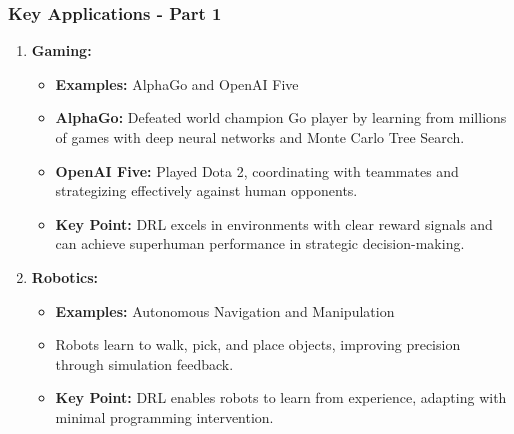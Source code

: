 \documentclass[aspectratio=169]{beamer}
\begin{document}
\begin{frame}[fragile]
    \frametitle{Key Applications - Part 1}
    \begin{enumerate}
        \item \textbf{Gaming:}
            \begin{itemize}
                \item \textbf{Examples:} AlphaGo and OpenAI Five
                \item \textbf{AlphaGo:} Defeated world champion Go player by learning from millions of games with deep neural networks and Monte Carlo Tree Search.
                \item \textbf{OpenAI Five:} Played Dota 2, coordinating with teammates and strategizing effectively against human opponents.
                \item \textbf{Key Point:} DRL excels in environments with clear reward signals and can achieve superhuman performance in strategic decision-making.
            \end{itemize}
        
        \item \textbf{Robotics:}
            \begin{itemize}
                \item \textbf{Examples:} Autonomous Navigation and Manipulation
                \item Robots learn to walk, pick, and place objects, improving precision through simulation feedback.
                \item \textbf{Key Point:} DRL enables robots to learn from experience, adapting with minimal programming intervention.
            \end{itemize}
    \end{enumerate}
\end{frame}
\end{document}

